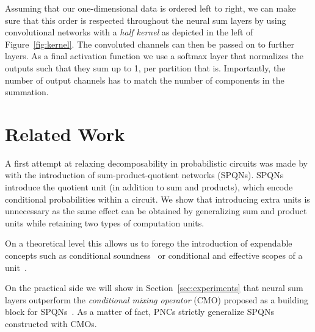 \documentclass[letterpaper]{article} %
\begin{document}
Assuming that our one-dimensional data is ordered left to right, we can make sure that this order is respected throughout the neural sum layers by using convolutional networks with a \textit{half kernel} as depicted in the left of Figure~\ref{fig:kernel}. The convoluted channels can then be passed on to further layers. As a final activation function we use a softmax layer that normalizes the outputs such that they sum up to 1, per partition that is.
Importantly, the number of output channels has to match the number of components in the summation.








\section{Related Work}
\label{sec:related}

A first attempt at relaxing decomposability in probabilistic circuits was made by \citet{sharir2018sum} with the introduction of sum-product-quotient networks (SPQNs). SPQNs introduce the quotient unit (in addition to sum and products), which encode conditional probabilities within a circuit. We show that introducing extra units is unnecessary as the same effect can be obtained by generalizing sum and product units while retaining two types of computation units.

On a theoretical level this allows us to forego the introduction of expendable concepts such as conditional soundness~\cite[Definition 5]{sharir2018sum} or conditional and effective scopes of a unit~\citep[Section 3]{sharir2018sum}.

On the practical side we will show in Section~\ref{sec:experiments} that neural sum layers outperform the \textit{conditional mixing operator} (CMO) proposed as a building block for SPQNs~\citep[Definition 6]{sharir2018sum}. As a matter of fact, PNCs strictly generalize SPQNs constructed with CMOs.
\end{document}
